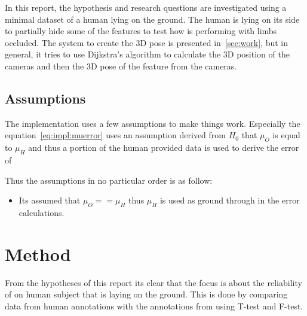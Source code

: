 In this report, the hypothesis and research questions are investigated using a minimal dataset of a human lying on the ground.
The human is lying on its side to partially hide some of the features to test how \openpose{ } is performing with limbs occluded.
The system to create the 3D pose is presented in~\ref{sec:work}, but in general, it tries to use Dijkstra's algorithm to calculate the 3D position of the cameras and then the 3D pose of the feature from the cameras.





\subsection{Assumptions}%
\label{sub:assumptions}
The implementation uses a few assumptions to make things work.
Especially the equation~\ref{eq:impl:muerror} uses an assumption derived from $H_0$ that $\mu_O$ is equal to $\mu_H$ and
thus a portion of the human provided data is used to derive the error of 

\noindent
Thus the assumptions in no particular order is as follow:
\begin{itemize}
    \item Its assumed that $\mu_O == \mu_H$ thus $\mu_H$ is used as ground through in the error calculations.
\end{itemize}


\section{Method}
\label{sec:method}
From the hypotheses of this report its clear that the focus is about the reliability of \openpose{ } on human subject that is laying on the ground.
This is done by comparing  data from human annotations with the annotations from \operpose{} using T-test and F-test.


